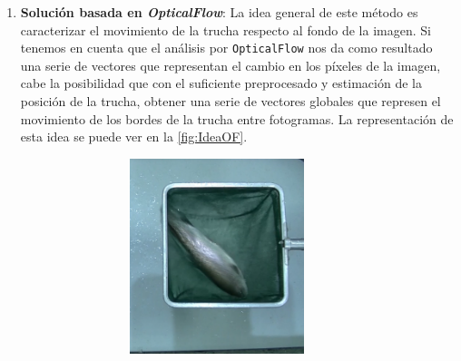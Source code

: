 \begin{enumerate}
    \item \textbf{Solución basada en \textit{OpticalFlow}}: La idea general de este método es caracterizar el movimiento de la trucha respecto al 
    fondo de la imagen.\newline
    Si tenemos en cuenta que el análisis por \texttt{OpticalFlow} nos da como resultado una serie de vectores que representan el cambio en los 
    píxeles de la imagen, cabe la posibilidad que con el suficiente preprocesado y estimación de la posición de la trucha, obtener una serie de 
    vectores globales que represen el movimiento de los bordes de la trucha entre fotogramas. La representación de esta idea se puede ver en la \autoref{fig:IdeaOF}.

    \begin{figure}[H]
        \centering
            \begin{subfigure}[b]{\textwidth}
                \centering
                \begin{subfigure}[b]{0.25\textwidth}
                    \centering
                    \includegraphics[width=0.8\textwidth]{images/6/SinOptical2.png}
                    \label{fig:SinOptical2}
                \end{subfigure}
                \begin{subfigure}[b]{0.25\textwidth}
                    \centering

\end{subfigure}
\end{subfigure}
\end{figure}
\end{enumerate}
